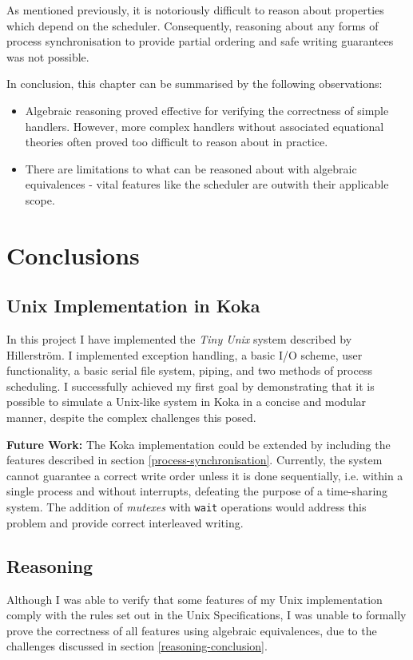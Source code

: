 \documentclass[logo,bsc,singlespacing,parskip]{infthesis}
\begin{document}
As mentioned previously, it is notoriously difficult  to reason about properties which depend on the scheduler. Consequently, reasoning about any forms of process synchronisation to provide partial ordering and safe writing guarantees was not possible.

In conclusion, this chapter can be summarised by the following observations:
\begin{itemize}
    \item Algebraic reasoning proved effective for verifying the correctness of simple handlers. However, more complex handlers without associated equational theories often proved too difficult to reason about in practice.
    \item There are limitations to what can be reasoned about with algebraic equivalences - vital features like the scheduler are outwith their applicable scope.
\end{itemize}


\chapter{Conclusions}

\section{Unix Implementation in Koka}
In this project I have implemented the \textit{Tiny Unix} system described by Hillerström. I implemented exception handling, a basic I/O scheme, user functionality, a basic serial file system, piping, and two methods of process scheduling. I successfully achieved my first goal by demonstrating that it is possible to simulate a Unix-like system in Koka in a concise and modular manner, despite the complex challenges this posed.

\textbf{Future Work: } The Koka implementation could be extended by including the features described in section \ref{process-synchronisation}. Currently, the system cannot guarantee a correct write order unless it is done sequentially, i.e. within a single process and without interrupts, defeating the purpose of a time-sharing system. The addition of \textit{mutexes} with \lstinline{wait} operations would address this problem and provide correct interleaved writing.

\section{Reasoning}
Although I was able to verify that some features of my Unix implementation comply with the rules set out in the Unix Specifications, I was unable to formally prove the correctness  of all features using algebraic equivalences, due to the challenges discussed in section \ref{reasoning-conclusion}.
\end{document}
